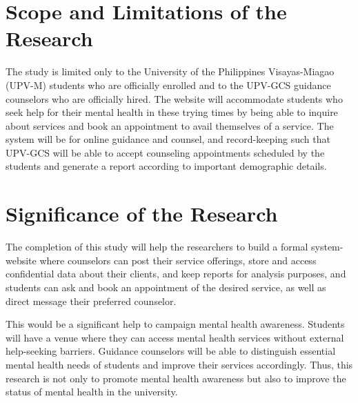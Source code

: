 \section{Scope and Limitations of the Research}
\label{sec:scopelimitations}

The study is limited only to the University of the Philippines Visayas-Miagao (UPV-M) students who are officially enrolled and to the UPV-GCS guidance counselors who are officially hired. The website will accommodate students who seek help for their mental health in these trying times by being able to inquire about services and book an appointment to avail themselves of a service. The system will be for online guidance and counsel, and record-keeping such that UPV-GCS will be able to accept counseling appointments scheduled by the students and generate a report according to important demographic details. 

\begin{comment}

%
%
Generally, one paragraph should be allotted for each of your research objectives.

Each paragraph contains a brief overview of the concept/theory and the purpose of doing the associated objective.

Each paragraph also includes a description of the scope/limitation of your study.

* Please refer to the slides for examples.

\end{comment}


\section{Significance of the Research}
\label{sec:significance}

The completion of this study will help the researchers to build a formal system-website where counselors can post their service offerings, store and access confidential data about their clients, and keep reports for analysis purposes, and students can ask and book an appointment of the desired service, as well as direct message their preferred counselor. 

This would be a significant help to campaign mental health awareness. Students will have a venue where they can access mental health services without external help-seeking barriers. Guidance counselors will be able to distinguish essential mental health needs of students and improve their services accordingly. Thus, this research is not only to promote mental health awareness but also to improve the status of mental health in the university. 




